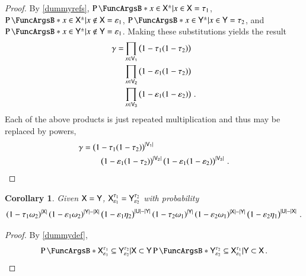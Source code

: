 \documentclass[10pt,final,hidelinks]{article}
\numberwithin{equation}{section}
\providecommand{\Given}{\vert}
\DeclarePairedDelimiter\Card{\lvert}{\rvert}
\newcommand{\tprate}{\tau}
\newcommand{\fprate}{\varepsilon}
\newcommand{\fnrate}{\omega}
\newcommand{\tnrate}{\eta}
\theoremstyle{plain}
\newtheorem{corollary}{Corollary}[theorem]
\begin{document}
\begin{proof}
	By \cref{dummyrefs}, $\Prob{x \in \ASet{X} \Given x \in \Set{X}} = \tprate_1$, 
	$\Prob{x \in \ASet{X} \Given x \notin \Set{X}} = \fprate_1$, $\Prob{x \in 
		\ASet{Y} \Given x \in \Set{Y}} = \tprate_2$, and $\Prob{x \in \ASet{Y} \Given x 
		\notin \Set{Y}} = \fprate_1$. Making these substitutions yields the result
	\begin{equation}
	\begin{split}
	\gamma =
	&\prod_{x \in \Set{V}[1]}
	\left(1 -
	\tprate_1
	(1 - \tprate_2)
	\right)\\
	&\prod_{x \in \Set{V}[2]}
	\left(1 -
	\fprate_1
	(1 - \tprate_2)
	\right)\\
	&\prod_{x \in \Set{V}[3]}
	\left(1 -
	\fprate_1
	(1 - \fprate_2)
	\right)\,.  
	\end{split}    
	\end{equation}
	Each of the above products is just repeated multiplication and thus may be 
	replaced by powers,
	\begin{equation}
	\begin{split}
	\gamma &=
	\left(1 - \tprate_1(1 - \tprate_2)\right)^{\Card{\Set{V}[1]}}\\
	&\qquad \left(1 - \fprate_1(1 - \tprate_2)\right)^{\Card{\Set{V}[2]}}
	\left(1 - \fprate_1(1 - \fprate_2)\right)^{\Card{\Set{V}[3]}}\,.  
	\end{split}
	\end{equation}
\end{proof}


\begin{corollary}
Given $\Set{X} = \Set{Y}$, $\ASet{X}[\fprate_1][\tprate_1] = \ASet{Y}[\fprate_2][\tprate_2]$ with probability
\begin{equation}
\left(1 - \tprate_1\fnrate_2\right)^{\Card{\Set{X}}}
\left(1 - \fprate_1\fnrate_2\right)^{\Card{\Set{Y}} - \Card{\Set{X}}}
\left(1 - \fprate_1\tnrate_2\right)^{\Card{\Set{U}} - \Card{\Set{Y}}}
\left(1 - \tprate_2\fnrate_1\right)^{\Card{\Set{Y}}}
\left(1 - \fprate_2\fnrate_1\right)^{\Card{\Set{X}} - \Card{\Set{Y}}}
\left(1 - \fprate_2\tnrate_1\right)^{\Card{\Set{U}} - \Card{\Set{X}}}\,.
\end{equation}
\end{corollary}
\begin{proof}
By \cref{dummydef},
\begin{equation}
	\Prob{\ASet{X}[\fprate_1][\tprate_1] \subseteq \ASet{Y}[\fprate_2][\tprate_2]\Given \Set{X} \subset \Set{Y}} \Prob{\ASet{Y}[\fprate_2][\tprate_2] \subseteq \ASet{X}[\fprate_1][\tprate_1] \Given \Set{Y} \subset \Set{X}}\,.
\end{equation}
\end{proof}
\end{document}
